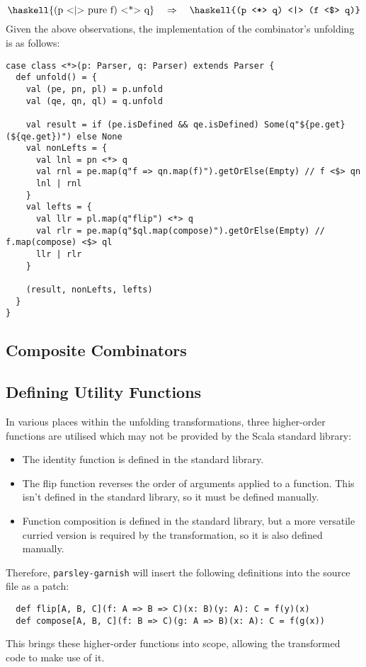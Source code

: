 \documentclass[../../main.tex]{subfiles}
\begin{document}
\begin{equation} \label{eq:ap-leftrec}
\text{\haskell{(p <|> pure f) <*> q}} \quad \Rightarrow \quad \text{\haskell{(p <*> q) <|> (f <$> q)}}
\vspace{3ex} %
\end{equation}
%
Given the above observations, the implementation of the \scala{<*>} combinator's unfolding is as follows:
\begin{verbatim}
case class <*>(p: Parser, q: Parser) extends Parser {
  def unfold() = {
    val (pe, pn, pl) = p.unfold
    val (qe, qn, ql) = q.unfold

    val result = if (pe.isDefined && qe.isDefined) Some(q"${pe.get}(${qe.get})") else None
    val nonLefts = {
      val lnl = pn <*> q
      val rnl = pe.map(q"f => qn.map(f)").getOrElse(Empty) // f <$> qn
      lnl | rnl
    }
    val lefts = {
      val llr = pl.map(q"flip") <*> q
      val rlr = pe.map(q"$ql.map(compose)").getOrElse(Empty) // f.map(compose) <$> ql
      llr | rlr
    }

    (result, nonLefts, lefts)
  }
}
\end{verbatim}

\subsection{Composite Combinators}

\subsection{Defining Utility Functions}
In various places within the unfolding transformations, three higher-order functions are utilised which may not be provided by the Scala standard library:
\begin{itemize}
  \item The identity function  is defined in the standard library.
  \item The flip function reverses the order of arguments applied to a function. This isn't defined in the standard library, so it must be defined manually.
  \item Function composition is defined in the standard library, but a more versatile curried version is required by the transformation, so it is also defined manually.
\end{itemize}
%
Therefore, \texttt{parsley-garnish} will insert the following definitions into the source file as a patch:
\begin{verbatim}
  def flip[A, B, C](f: A => B => C)(x: B)(y: A): C = f(y)(x)
  def compose[A, B, C](f: B => C)(g: A => B)(x: A): C = f(g(x))
\end{verbatim}
%
This brings these higher-order functions into scope, allowing the transformed code to make use of it.
\end{document}
